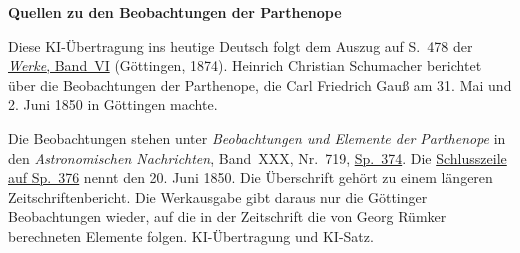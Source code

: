 \clearpage\thispagestyle{empty}
\begin{center}\textbf{Quellen zu den Beobachtungen der Parthenope}\end{center}
\noindent Diese KI-Übertragung ins heutige Deutsch folgt dem Auszug auf S.~478 der \href{https://gdz.sub.uni-goettingen.de/id/PPN236007467}{\textit{Werke}, Band~VI} (Göttingen, 1874). Heinrich Christian Schumacher berichtet über die Beobachtungen der Parthenope, die Carl Friedrich Gauß am 31. Mai und 2. Juni 1850 in Göttingen machte.
\par\smallskip\noindent Die Beobachtungen stehen unter \textit{Beobachtungen und Elemente der Parthenope} in den \textit{Astronomischen Nachrichten}, Band~XXX, Nr.~719, \href{https://api.digitale-sammlungen.de/iiif/image/v2/bsb10049455_00191/full/1800,/0/default.jpg}{Sp.~374}. Die \href{https://api.digitale-sammlungen.de/iiif/image/v2/bsb10049455_00192/full/1800,/0/default.jpg}{Schlusszeile auf Sp.~376} nennt den 20. Juni 1850. Die Überschrift gehört zu einem längeren Zeitschriftenbericht. Die Werkausgabe gibt daraus nur die Göttinger Beobachtungen wieder, auf die in der Zeitschrift die von Georg Rümker berechneten Elemente folgen. KI-Übertragung und KI-Satz.
\clearpage
